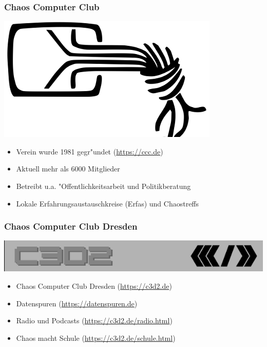 \documentclass[12pt]{beamer}
\begin{document}
\begin{frame}
    \frametitle{Chaos Computer Club}
    \begin{center}
	\includegraphics[height=0.2\textheight]{img/chaosknoten.png}
    \end{center}	
    \begin{itemize}
      \item<1-> Verein wurde 1981 gegr"undet (\url{https://ccc.de})          
      \item<2-> Aktuell mehr als 6000 Mitglieder
      \item<3-> Betreibt u.a. "Offentlichkeitsarbeit und Politikberatung      
      \item<4-> Lokale Erfahrungsaustauschkreise (Erfas) und Chaostreffs
    \end{itemize}
\end{frame}

\begin{frame}
  \frametitle{Chaos Computer Club Dresden}
  \begin{center}
    \includegraphics[height=0.1\textheight]{img/c3d2_logo.png}
  \end{center}
  \begin{itemize}
    \item<1-> Chaos Computer Club Dresden (\url{https://c3d2.de})          
    \item<2-> Datenspuren (\url{https://datenspuren.de})
    \item<3-> Radio und Podcasts (\url{https://c3d2.de/radio.html})
    \item<4-> Chaos macht Schule (\url{https://c3d2.de/schule.html})
  \end{itemize}
\end{frame}
\end{document}
